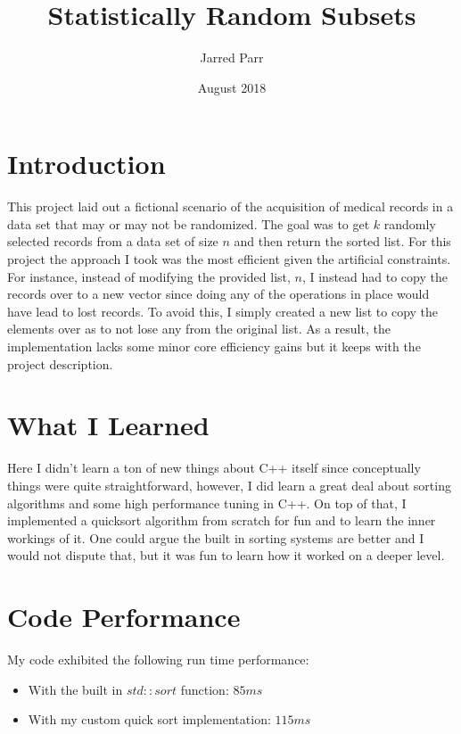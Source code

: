 \documentclass[11pt]{article}
\begin{document}
\title{Statistically Random Subsets}
\author{Jarred Parr}
\date{August 2018}
\maketitle

\section{Introduction}
This project laid out a fictional scenario of the acquisition of medical records in a data set that may or may not be randomized. The goal was to get $k$ randomly selected records from a data set of size $n$ and then return the sorted list. For this project the approach I took was the most efficient given the artificial constraints. For instance, instead of modifying the provided list, $n$, I instead had to copy the records over to a new vector since doing any of the operations in place would have lead to lost records. To avoid this, I simply created a new list to copy the elements over as to not lose any from the original list. As a result, the implementation lacks some minor core efficiency gains but it keeps with the project description.

\section{What I Learned}
Here I didn't learn a ton of new things about C++ itself since conceptually things were quite straightforward, however, I did learn a great deal about sorting algorithms and some high performance tuning in C++. On top of that, I implemented a quicksort algorithm from scratch for fun and to learn the inner workings of it. One could argue the built in sorting systems are better and I would not dispute that, but it was fun to learn how it worked on a deeper level.

\section{Code Performance}
My code exhibited the following run time performance:
\begin{itemize}
\item With the built in $std::sort$ function: $85ms$
\item With my custom quick sort implementation: $115ms$
\end{itemize}
\end{document}
